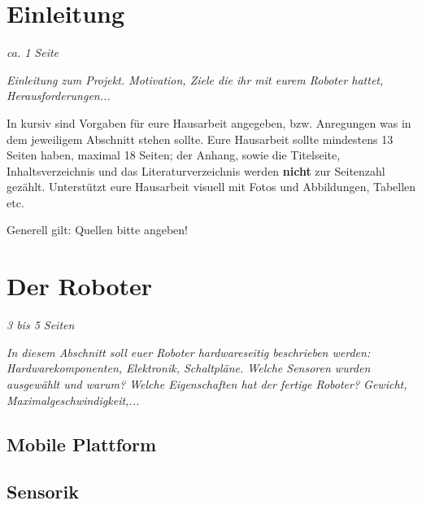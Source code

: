 \documentclass[12pt,a4paper,oneside]{article}
\begin{document}
	\usetikzlibrary{shapes,arrows}
\begin{spacing}{1.15}                       %

	
    \clearpage
    \tableofcontents                        %
    \thispagestyle{empty}
    \clearpage   
	\setcounter{page}{1}
	\section{Einleitung}
	\textit{ca. 1 Seite}
	
	\textit{Einleitung zum Projekt. Motivation, Ziele die ihr mit eurem Roboter hattet, Herausforderungen...}
	
	In kursiv sind Vorgaben für eure Hausarbeit angegeben, bzw. Anregungen was in dem jeweiligem Abschnitt stehen sollte. Eure Hausarbeit sollte mindestens 13 Seiten haben, maximal 18 Seiten; der Anhang, sowie die Titelseite, Inhaltsverzeichnis und das Literaturverzeichnis werden \textbf{nicht} zur Seitenzahl gezählt. Unterstützt eure Hausarbeit visuell mit Fotos und Abbildungen, Tabellen etc. 
	
Generell gilt: Quellen bitte angeben! \cite{Dem13}
	
\section{Der Roboter}
\textit{3 bis 5 Seiten}	
	
\textit{In diesem Abschnitt soll euer Roboter hardwareseitig beschrieben werden: Hardwarekomponenten, Elektronik, Schaltpläne. Welche Sensoren wurden ausgewählt und warum? Welche Eigenschaften hat der fertige Roboter? Gewicht, Maximalgeschwindigkeit,...}

\subsection{Mobile Plattform}

\subsection{Sensorik}

	


\end{spacing}
\end{document}
